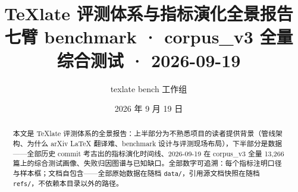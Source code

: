 \documentclass[11pt,a4paper]{ctexart}
\title{\bfseries TeXlate 评测体系与指标演化全景报告\\[4pt]
  \large 七臂 benchmark · corpus\_v3 全量综合测试 · 2026-09-19}
\author{texlate bench 工作组}
\date{2026 年 9 月 19 日}
\begin{document}
\maketitle

\begin{abstract}
\noindent 本文是 TeXlate 评测体系的全景报告：上半部分为不熟悉项目的读者提供背景（管线架构、为什么 arXiv LaTeX 翻译难、benchmark 设计与评测现场布局），下半部分是数据——全部历史 commit 考古出的指标演化时间线、2026-09-19 在 corpus\_v3 全量 13{,}266 篇上的综合测试画像、失败归因图谱与已知缺口。全部数字可追溯：每个指标注明口径与样本框；文档自包含——全部原始数据在随档 \texttt{data/}，引用源文档快照在随档 \texttt{refs/}，不依赖本目录以外的路径。
\end{abstract}

\vspace{1em}
\tableofcontents
\newpage

\end{document}
